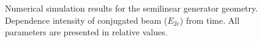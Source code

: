 \begin{figure}
\centering

\caption{
Numerical simulation results for the semilinear generator
geometry. Dependence intensity of conjugated beam ($E_{2c}$) from
time. All parameters are presented in relative values.
}
\label{figNum}
\end{figure}